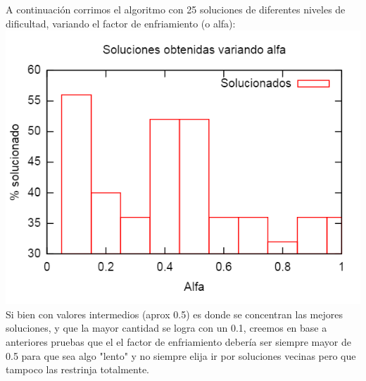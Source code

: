 A continuación corrimos el algoritmo con 25 soluciones de diferentes niveles de dificultad, variando el factor de enfriamiento (o alfa):
\includegraphics[scale=0.6]{imgs/porc_soluc.png}	
Si bien con valores intermedios (aprox 0.5) es donde se concentran las mejores soluciones, y que la mayor cantidad se logra con un 0.1, creemos en base a anteriores pruebas que el el factor de enfriamiento debería ser siempre mayor de 0.5 para que sea algo "lento" y no siempre elija ir por soluciones vecinas pero que tampoco las restrinja totalmente. 
